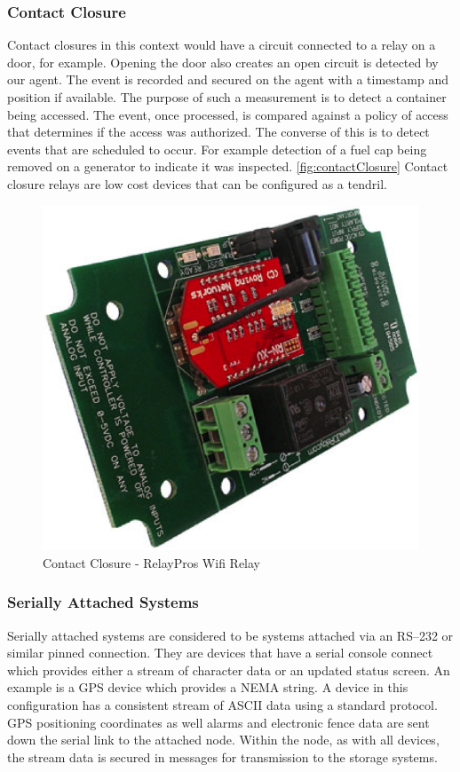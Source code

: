 \subsubsection{Contact Closure}
Contact closures\cite{OmegaEngineeringInc:vi} in this context would have a circuit connected to a relay on a door, for example. Opening the door also creates an open circuit is detected by our agent. The event is recorded and secured on the agent with a timestamp and position if available. The purpose of such a measurement is to detect a container being accessed. The event, once processed, is compared against a policy of access that determines if the access was authorized. The converse of this is to detect events that are scheduled to occur. For example detection of a fuel cap being removed on a generator to indicate it was inspected. \autoref{fig:contactClosure} Contact closure relays are low cost devices that can be configured as a tendril\cite{Anonymous:wa}.
\begin{figure}
\centering
\includegraphics{Figures/contactClosure}
\caption{Contact Closure - RelayPros Wifi Relay}
\label{fig:contactClosure}
\end{figure}
\subsubsection{Serially Attached Systems} 
Serially attached systems are considered to be systems attached via an RS–232 or similar pinned connection. They are devices that have a serial console connect which provides either a stream of character data or an updated status screen. An example is a GPS device which provides a NEMA string. A device in this configuration has a consistent stream of ASCII data using a standard protocol. GPS positioning coordinates as well alarms and electronic fence data are sent down the serial link to the attached node. Within the node, as with all devices, the stream data is secured in messages for transmission to the storage systems.
